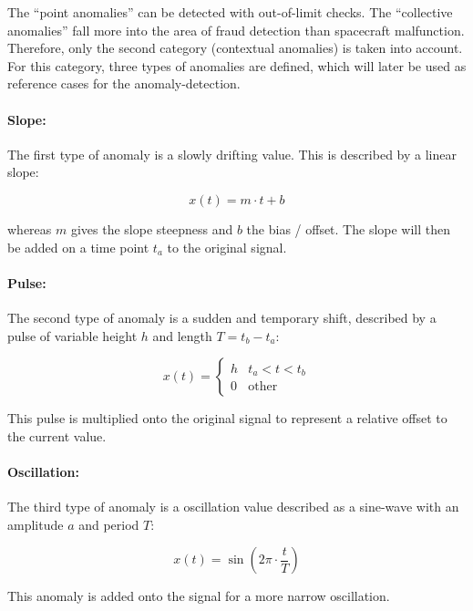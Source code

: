 The \enquote{point anomalies} can be detected with out-of-limit checks. The \enquote{collective anomalies} fall more into the area of fraud detection than spacecraft malfunction. \newline Therefore, only the second category (contextual anomalies) is taken into account. For this category, three types of anomalies are defined, which will later be used as reference cases for the anomaly-detection.

\paragraph{Slope:}
The first type of anomaly is a slowly drifting value. This is described by a linear slope:

\begin{equation}
x(t) = m\cdot t + b
\end{equation}

whereas $m$ gives the slope steepness and $b$ the bias / offset. The slope will then be added on a time point $t_a$ to the original signal.

\paragraph{Pulse:}
The second type of anomaly is a sudden and temporary shift, described by a pulse of variable height $h$ and length $T = t_b - t_a$:

\begin{equation}
x(t) = \begin{cases} h & t_a < t < t_b \\ 0 & \text{other} \end{cases}
\end{equation}

This pulse is multiplied onto the original signal to represent a relative offset to the current value.

\paragraph{Oscillation:}
The third type of anomaly is a oscillation value described as a sine-wave with an amplitude $a$ and period $T$:

\begin{equation}
x(t) = \sin (2\pi \cdot \frac{t}{T} )
\end{equation}

This anomaly is added onto the signal for a more narrow oscillation.

